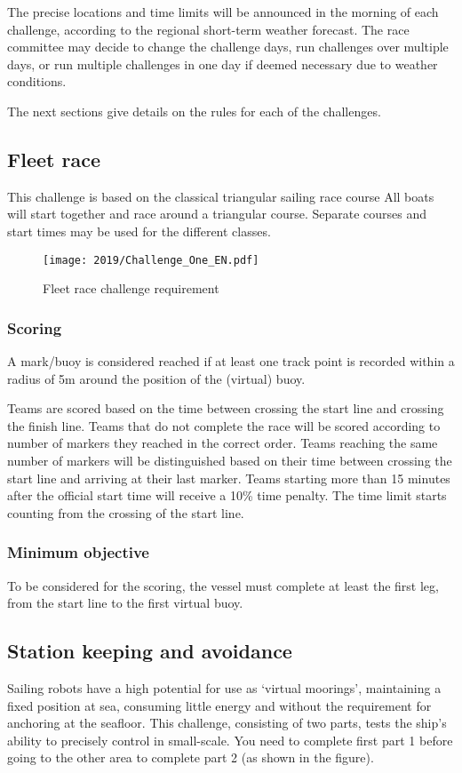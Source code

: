 \documentclass[12pt]{article}
\begin{document}
The precise locations and time limits will be announced in the morning of each challenge, 
according to the regional short-term weather forecast.
The race committee may decide to change the challenge days, run challenges over
multiple days, or run multiple challenges in one day if deemed necessary due 
to weather conditions.

The next sections give details on the rules for each of the challenges.

\subsection{Fleet race}

This challenge is based on the classical triangular sailing race course
All boats will start together and race around a triangular course. Separate
courses and start times may be used for the different classes.

\begin{figure}[H]
  \centering
  \texttt{[image: 2019/Challenge\_One\_EN.pdf]}
  \caption{Fleet race challenge requirement}
  \label{fig:fleetrace}
\end{figure}

\subsubsection{Scoring}
A mark/buoy is considered reached if at least one
track point is recorded within a radius of 5m around the position of the
(virtual) buoy.

Teams are scored based on the time between crossing the start line and crossing
the finish line. Teams that do not complete the race will be scored
according to number of markers they reached in the correct order. Teams reaching
the same number of markers will be distinguished based on their time between
crossing the start line and arriving at their last marker. Teams starting more
than 15 minutes after the official start time will receive a 10\% time penalty.
The time limit starts counting from the crossing of the start line.

\subsubsection{Minimum objective}
To be considered for the scoring, the vessel must complete at least the first
leg, from the start line to the first virtual buoy.

\subsection{Station keeping and avoidance}
Sailing robots have a high potential for use as `virtual moorings', maintaining
a fixed position at sea, consuming little energy and without the requirement for
anchoring at the seafloor.
This challenge, consisting of two parts, tests the ship's ability to precisely control in small-scale.
You need to complete first part 1 before going to the other area to complete part 2 (as shown in the figure). 
\end{document}
